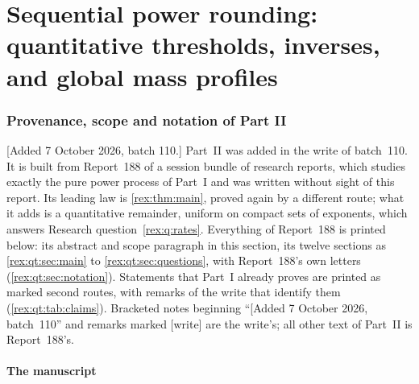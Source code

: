\part{Sequential power rounding: quantitative thresholds, inverses, and global mass profiles}
\label{rex:qt:part}

\section{Provenance, scope and notation of Part II}\label{rex:qt:sec:front}

[Added 7 October 2026, batch 110.] Part~II was added in the write of
batch~110. It is built from Report~188 of a session bundle of research
reports, which studies exactly the pure power process of Part~I and was
written without sight of this report. Its leading law is
\cref{rex:thm:main}, proved again by a different route; what it adds is
a quantitative remainder, uniform on compact sets of exponents, which
answers Research question~\ref{rex:q:rates}. Everything of Report~188 is
printed below: its abstract and scope paragraph in this section, its
twelve sections as \cref{rex:qt:sec:main} to \cref{rex:qt:sec:questions},
with Report~188's own letters (\cref{rex:qt:sec:notation}). Statements
that Part~I already proves are printed as marked second routes, with
remarks of the write that identify them (\cref{rex:qt:tab:claims}).
Bracketed notes beginning ``[Added 7 October 2026, batch~110'' and remarks
marked \textsf{[write]} are the write's; all other text of Part~II is
Report~188's.

\subsection{The manuscript}\label{rex:qt:sec:provenance}

